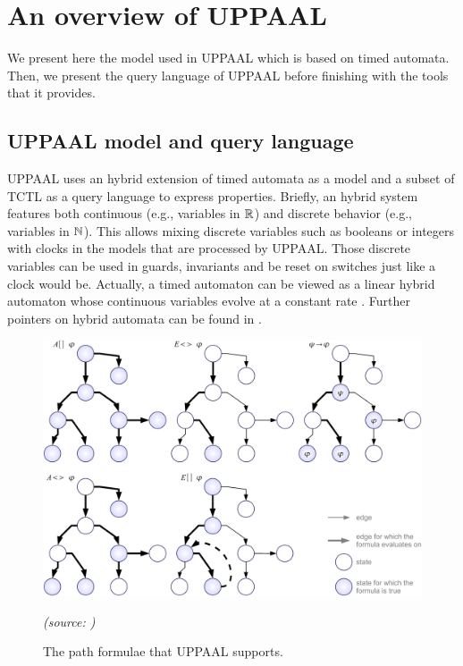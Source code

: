
\chapter{An overview of UPPAAL}
\label{chap:uppaal}


We present here the model used in UPPAAL which is based on timed automata. Then, we present the query language of UPPAAL before finishing with the tools that it provides.


\section{UPPAAL model and query language}


UPPAAL uses an hybrid extension of timed automata as a model and a subset of TCTL as a query language to express properties. Briefly, an hybrid system \cite{alur97symbolic} features both continuous (e.g., variables in $\mathbb{R}$) and discrete behavior (e.g., variables in $\mathbb{N}$). This allows mixing discrete variables such as booleans or integers with clocks in the models that are processed by UPPAAL. Those discrete variables can be used in guards, invariants and be reset on switches just like a clock would be. Actually, a timed automaton can be viewed as a linear hybrid automaton whose continuous variables evolve at a constant rate \cite{alur97symbolic}. Further pointers on hybrid automata can be found in \cite{Miller00, HYTECH, ACHH93}. \\

\begin{figure}[htbp]
    \centering
    \includegraphics[width=\textwidth]{content/timed-automata/uppaal-path-formulae}
    \begin{flushright}
    	\textit{(source: \cite{UPPAAL})}
    \end{flushright}
    \caption{The path formulae that UPPAAL supports.}
    \label{fig:uppaal-path-formulae}
\end{figure}

